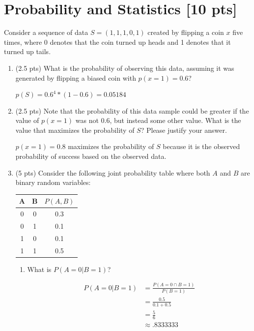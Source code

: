 \documentclass[a4paper]{article}
\theoremstyle{definition}
\newenvironment{soln}{
	\leavevmode\color{blue}\ignorespaces
}{}
\begin{document}
	
	\section{Probability and Statistics [10 pts]}
	Consider a sequence of data $S = (1, 1, 1, 0, 1)$ created by flipping a coin $x$ five times, where 0 denotes that the coin turned up heads and 1 denotes that it turned up tails.
	\begin{enumerate}
		\item 	(2.5 pts) What is the probability of observing this data, assuming it was generated by flipping a biased coin with $p(x=1) = 0.6$?
		
		\begin{soln} $p(S) = 0.6^{4} * (1 - 0.6) = 0.05184$ \end{soln}
		
		\item 	(2.5 pts) Note that the probability of this data sample could be greater if the value of $p(x = 1)$ was not $0.6$, but instead some other value. What is the value that maximizes the probability of $S$? Please justify your answer.
		
		\begin{soln} $p(x=1) = 0.8$ maximizes the probability of $S$ because it is the observed probability of success based on the observed data. \end{soln}
		
		\item 	(5 pts) Consider the following joint probability table where both $A$ and $B$ are binary random variables: 
		\begin{table}[htb]
			\centering
			\begin{tabular}{ccc}\hline
				A & B & $P(A, B)$  \\\hline
				0 & 0 & 0.3 \\
				0 & 1 & 0.1 \\
				1 & 0 & 0.1 \\
				1 & 1 & 0.5 \\\hline
			\end{tabular}
		\end{table}
		\begin{enumerate}
			\item 	What is $P(A = 0 | B = 1)$?\\
			\begin{soln}
				$$
				\begin{aligned}
					P(A = 0 | B = 1) & = \frac{P(A = 0 \cap B = 1)}{P(B = 1)} \\
					& = \frac{0.5}{0.1+0.5} \\
					& = \frac{5}{6}\\
					& \approx .8333333
				\end{aligned}
				$$
			\end{soln}
			 

\end{enumerate}
\end{enumerate}
\end{document}
